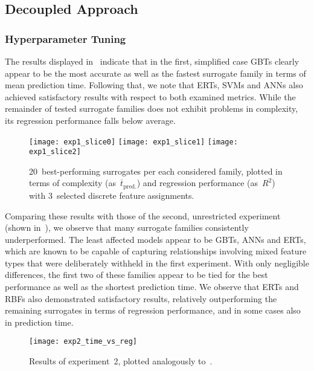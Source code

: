 
\subsection{Decoupled Approach}
\label{sec:modelres}

\subsubsection{Hyperparameter Tuning}

The results displayed in~ indicate that in the first,
simplified case GBTs clearly appear to be the most accurate as
well as the fastest surrogate family in terms of mean prediction time. Following
that, we note that ERTs, SVMs and ANNs also achieved satisfactory results with respect to both examined metrics.
While the remainder of tested surrogate families does not exhibit problems in
complexity, its regression performance falls below average.

\begin{figure}
	\centering
	\texttt{[image: exp1\_slice0]}
	\texttt{[image: exp1\_slice1]}
	\texttt{[image: exp1\_slice2]}
	\caption{\label{fig:exp1-time-vs-reg}20~best-performing surrogates per each considered family, plotted in
		terms of complexity (as~$\overline{t}_{\text{pred.}}$) and regression
		performance (as~$R^2$) with 3~selected discrete feature assignments.}
\end{figure}

Comparing these results with those of the second, unrestricted experiment (shown
in~), we observe that many surrogate families
consistently underperformed. The least
affected models appear to be GBTs, ANNs and ERTs, which are known to be capable of capturing relationships
involving mixed feature types that were deliberately withheld in the first
experiment. With only negligible differences, the first two of these families
appear to be tied for the best performance as well as the shortest prediction
time. We observe that ERTs and RBFs also
demonstrated satisfactory results, relatively outperforming the remaining surrogates in
terms of regression performance, and in some cases also in prediction time.

\begin{figure}
	\centering
	\texttt{[image: exp2\_time\_vs\_reg]}
	\caption{\label{fig:exp2-time-vs-reg}Results of experiment~2, plotted analogously
	to~.}
\end{figure}

